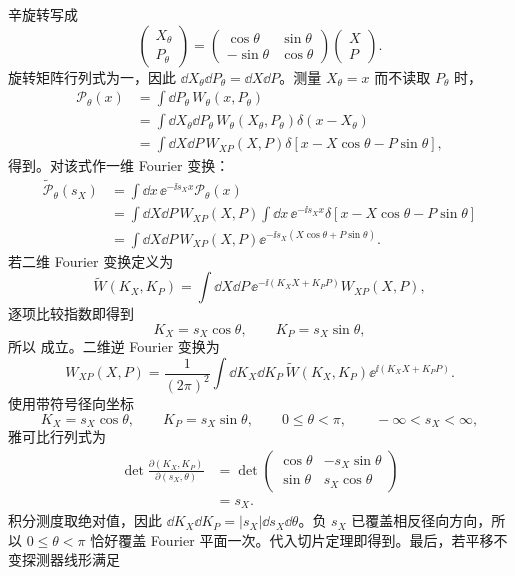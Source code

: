 \begin{exbox}[能量格与纵向相空间层析]
辛旋转写成
\[
\begin{pmatrix}X_\theta\\P_\theta\end{pmatrix}
=\begin{pmatrix}
\cos\theta&\sin\theta\\
-\sin\theta&\cos\theta
\end{pmatrix}
\begin{pmatrix}X\\P\end{pmatrix}.
\]
旋转矩阵行列式为一，因此 $\dd X_\theta\dd P_\theta=\dd X\dd P$。测量 $X_\theta=x$ 而不读取 $P_\theta$ 时，
\begin{align*}
\mathcal P_\theta(x)
&=\int\dd P_\theta\,W_\theta(x,P_\theta)\\
&=\int\dd X_\theta\dd P_\theta\,
W_\theta(X_\theta,P_\theta)\delta(x-X_\theta)\\
&=\int\dd X\dd P\,W_{XP}(X,P)
\delta[x-X\cos\theta-P\sin\theta],
\end{align*}
得到。对该式作一维 Fourier 变换：
\begin{align*}
\widetilde{\mathcal P}_\theta(s_X)
&=\int\dd x\,\ee^{-\ii s_Xx}\mathcal P_\theta(x)\\
&=\int\dd X\dd P\,W_{XP}(X,P)
\int\dd x\,\ee^{-\ii s_Xx}
\delta[x-X\cos\theta-P\sin\theta]\\
&=\int\dd X\dd P\,W_{XP}(X,P)
\ee^{-\ii s_X(X\cos\theta+P\sin\theta)}.
\end{align*}
若二维 Fourier 变换定义为
\[
\widetilde W(K_X,K_P)
=\int\dd X\dd P\,
\ee^{-\ii(K_XX+K_PP)}W_{XP}(X,P),
\]
逐项比较指数即得到
\[
K_X=s_X\cos\theta,
\qquad K_P=s_X\sin\theta,
\]
所以 成立。二维逆 Fourier 变换为
\[
W_{XP}(X,P)
=\frac1{(2\pi)^2}
\int\dd K_X\dd K_P\,
\widetilde W(K_X,K_P)
\ee^{\ii(K_XX+K_PP)}.
\]
使用带符号径向坐标
\[
K_X=s_X\cos\theta,
\qquad K_P=s_X\sin\theta,
\qquad 0\le\theta<\pi,
\qquad -\infty<s_X<\infty,
\]
雅可比行列式为
\begin{align*}
\det\frac{\partial(K_X,K_P)}{\partial(s_X,\theta)}
&=\det\begin{pmatrix}
\cos\theta&-s_X\sin\theta\\
\sin\theta&s_X\cos\theta
\end{pmatrix}\\
&=s_X.
\end{align*}
积分测度取绝对值，因此 $\dd K_X\dd K_P=|s_X|\dd s_X\dd\theta$。负 $s_X$ 已覆盖相反径向方向，所以 $0\le\theta<\pi$ 恰好覆盖 Fourier 平面一次。代入切片定理即得到。最后，若平移不变探测器线形满足

\end{exbox}
